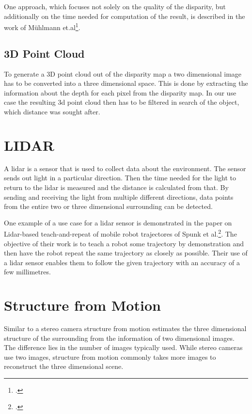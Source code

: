 One approach, which focuses not solely on the quality of the disparity, but additionally on the time needed for computation of the result, is described in the work of Mühlmann et.al\footcite{Muehlmann_Calculating_Dense_Disparity_Maps_from_Color_Stereo_Images}.

\subsection{3D Point Cloud}
To generate a 3D point cloud out of the disparity map a two dimensional image has to be converted into a three dimensional space. This is done by extracting the information about the depth for each pixel from the disparity map. In our use case the resulting 3d point cloud then has to be filtered in search of the object, which distance was sought after.

\section{LIDAR}
A lidar is a sensor that is used to collect data about the environment. The sensor sends out light in a particular direction. Then the time needed for the light to return to the lidar is measured and the distance is calculated from that. By sending and receiving the light from multiple different directions, data points from the entire two or three dimensional surrounding can be detected.

One example of a use case for a lidar sensor is demonstrated in the paper on Lidar-based teach-and-repeat of mobile robot trajectores of Spunk et al.\footcite{Sprunk_Lidar-based_teach-and-repeat_of_mobile_robot_trajectories}. The objective of their work is to teach a robot some trajectory by demonstration and then have the robot repeat the same trajectory as closely as possible. Their use of a lidar sensor enables them to follow the given trajectory with an accuracy of a few millimetres.

\section{Structure from Motion}
Similar to a stereo camera structure from motion estimates the three dimensional structure of the surrounding from the information of two dimensional images. The difference lies in the number of images typically used. While stereo cameras use two images, structure from motion commonly takes more images to reconstruct the three dimensional scene.

